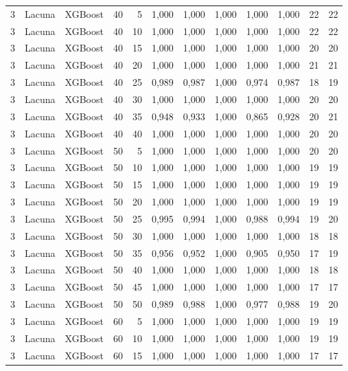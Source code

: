 \begin{longtable}{@{}rllrrrrrrrrr@{}}
3 & Lacuna & XGBoost & 40 & 5 & 1,000 & 1,000 & 1,000 & 1,000 & 1,000 & 22 & 22 \\
3 & Lacuna & XGBoost & 40 & 10 & 1,000 & 1,000 & 1,000 & 1,000 & 1,000 & 22 & 22 \\
3 & Lacuna & XGBoost & 40 & 15 & 1,000 & 1,000 & 1,000 & 1,000 & 1,000 & 20 & 20 \\
3 & Lacuna & XGBoost & 40 & 20 & 1,000 & 1,000 & 1,000 & 1,000 & 1,000 & 21 & 21 \\
3 & Lacuna & XGBoost & 40 & 25 & 0,989 & 0,987 & 1,000 & 0,974 & 0,987 & 18 & 19 \\
3 & Lacuna & XGBoost & 40 & 30 & 1,000 & 1,000 & 1,000 & 1,000 & 1,000 & 20 & 20 \\
3 & Lacuna & XGBoost & 40 & 35 & 0,948 & 0,933 & 1,000 & 0,865 & 0,928 & 20 & 21 \\
3 & Lacuna & XGBoost & 40 & 40 & 1,000 & 1,000 & 1,000 & 1,000 & 1,000 & 20 & 20 \\
3 & Lacuna & XGBoost & 50 & 5 & 1,000 & 1,000 & 1,000 & 1,000 & 1,000 & 20 & 20 \\
3 & Lacuna & XGBoost & 50 & 10 & 1,000 & 1,000 & 1,000 & 1,000 & 1,000 & 19 & 19 \\
3 & Lacuna & XGBoost & 50 & 15 & 1,000 & 1,000 & 1,000 & 1,000 & 1,000 & 19 & 19 \\
3 & Lacuna & XGBoost & 50 & 20 & 1,000 & 1,000 & 1,000 & 1,000 & 1,000 & 19 & 19 \\
3 & Lacuna & XGBoost & 50 & 25 & 0,995 & 0,994 & 1,000 & 0,988 & 0,994 & 19 & 20 \\
3 & Lacuna & XGBoost & 50 & 30 & 1,000 & 1,000 & 1,000 & 1,000 & 1,000 & 18 & 18 \\
3 & Lacuna & XGBoost & 50 & 35 & 0,956 & 0,952 & 1,000 & 0,905 & 0,950 & 17 & 19 \\
3 & Lacuna & XGBoost & 50 & 40 & 1,000 & 1,000 & 1,000 & 1,000 & 1,000 & 18 & 18 \\
3 & Lacuna & XGBoost & 50 & 45 & 1,000 & 1,000 & 1,000 & 1,000 & 1,000 & 17 & 17 \\
3 & Lacuna & XGBoost & 50 & 50 & 0,989 & 0,988 & 1,000 & 0,977 & 0,988 & 19 & 20 \\
3 & Lacuna & XGBoost & 60 & 5 & 1,000 & 1,000 & 1,000 & 1,000 & 1,000 & 19 & 19 \\
3 & Lacuna & XGBoost & 60 & 10 & 1,000 & 1,000 & 1,000 & 1,000 & 1,000 & 19 & 19 \\
3 & Lacuna & XGBoost & 60 & 15 & 1,000 & 1,000 & 1,000 & 1,000 & 1,000 & 17 & 17 \\

\end{longtable}
